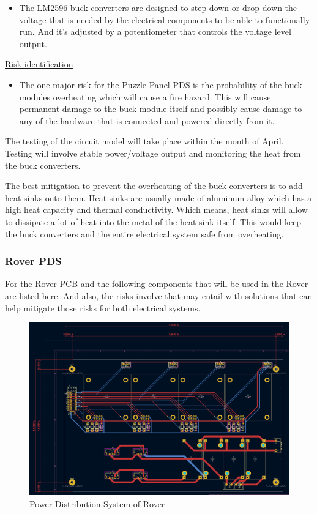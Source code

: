 \documentclass[a4paper, 10pt]{article}
\begin{document}

\begin{itemize}
\item
	The LM2596 buck converters are designed to step down or drop down the voltage that is needed by the electrical components to be able to functionally run. And it's adjusted by a potentiometer that controls the voltage level output.
\end{itemize}

\underline{Risk identification}

\begin{itemize}
\item
	The one major risk for the Puzzle Panel PDS is the probability of the buck modules overheating which will cause a fire hazard. This will cause permanent damage to the buck module itself and possibly cause damage to any of the hardware that is connected and powered directly from it. 
\end{itemize}

The testing of the circuit model will take place within the month of April. Testing will involve stable power/voltage output and monitoring the heat from the buck converters.

The best mitigation to prevent the overheating of the buck converters is to add heat sinks onto them. Heat sinks are usually made of aluminum alloy which has a high heat capacity and thermal conductivity. Which means, heat sinks will allow to dissipate a lot of heat into the metal of the heat sink itself. This would keep the buck converters and the entire electrical system safe from overheating.

 		\subsubsection*{Rover PDS}

 		For the Rover PCB and the following components that will be used in the Rover are listed here. And also, the risks involve that may entail with solutions that can help mitigate those risks for both electrical systems. 

		\begin{figure} [h]
			\centering
			\includegraphics[scale=0.2]{Photos/Rover PCB}
			\caption{Power Distribution System of Rover}
		\end{figure}
\end{document}
